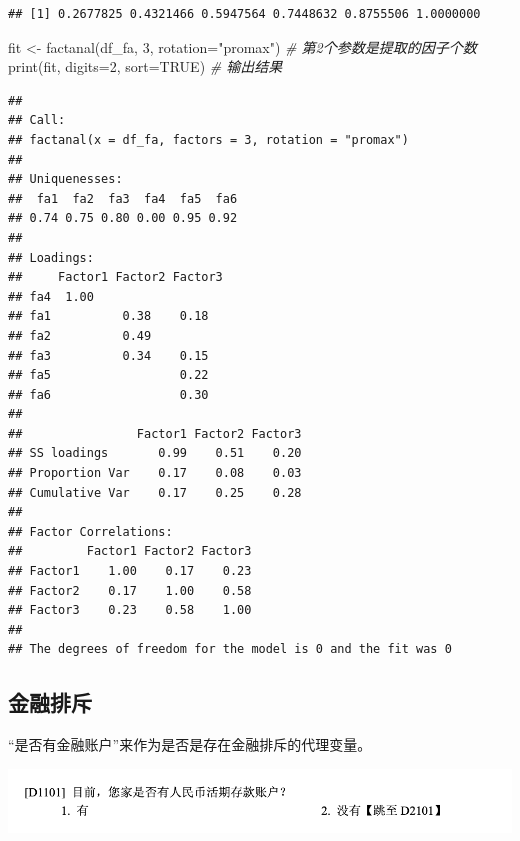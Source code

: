 \documentclass[
  oneside]{book}
\newenvironment{Shaded}{\begin{snugshade}}{\end{snugshade}}
\newcommand{\AttributeTok}[1]{\textcolor[rgb]{0.77,0.63,0.00}{#1}}
\newcommand{\CommentTok}[1]{\textcolor[rgb]{0.56,0.35,0.01}{\textit{#1}}}
\newcommand{\ConstantTok}[1]{\textcolor[rgb]{0.00,0.00,0.00}{#1}}
\newcommand{\DecValTok}[1]{\textcolor[rgb]{0.00,0.00,0.81}{#1}}
\newcommand{\FunctionTok}[1]{\textcolor[rgb]{0.00,0.00,0.00}{#1}}
\newcommand{\NormalTok}[1]{#1}
\newcommand{\OtherTok}[1]{\textcolor[rgb]{0.56,0.35,0.01}{#1}}
\newcommand{\StringTok}[1]{\textcolor[rgb]{0.31,0.60,0.02}{#1}}
\begin{document}
\begin{verbatim}
## [1] 0.2677825 0.4321466 0.5947564 0.7448632 0.8755506 1.0000000
\end{verbatim}

\begin{Shaded}
\begin{Highlighting}[]
\NormalTok{fit }\OtherTok{\textless{}{-}} \FunctionTok{factanal}\NormalTok{(df\_fa, }\DecValTok{3}\NormalTok{, }\AttributeTok{rotation=}\StringTok{"promax"}\NormalTok{) }\CommentTok{\# 第2个参数是提取的因子个数}
\FunctionTok{print}\NormalTok{(fit, }\AttributeTok{digits=}\DecValTok{2}\NormalTok{, }\AttributeTok{sort=}\ConstantTok{TRUE}\NormalTok{) }\CommentTok{\# 输出结果}
\end{Highlighting}
\end{Shaded}

\begin{verbatim}
## 
## Call:
## factanal(x = df_fa, factors = 3, rotation = "promax")
## 
## Uniquenesses:
##  fa1  fa2  fa3  fa4  fa5  fa6 
## 0.74 0.75 0.80 0.00 0.95 0.92 
## 
## Loadings:
##     Factor1 Factor2 Factor3
## fa4  1.00                  
## fa1          0.38    0.18  
## fa2          0.49          
## fa3          0.34    0.15  
## fa5                  0.22  
## fa6                  0.30  
## 
##                Factor1 Factor2 Factor3
## SS loadings       0.99    0.51    0.20
## Proportion Var    0.17    0.08    0.03
## Cumulative Var    0.17    0.25    0.28
## 
## Factor Correlations:
##         Factor1 Factor2 Factor3
## Factor1    1.00    0.17    0.23
## Factor2    0.17    1.00    0.58
## Factor3    0.23    0.58    1.00
## 
## The degrees of freedom for the model is 0 and the fit was 0
\end{verbatim}

\hypertarget{ux91d1ux878dux6392ux65a5}{%
\subsection{金融排斥}\label{ux91d1ux878dux6392ux65a5}}

``是否有金融账户''来作为是否是存在金融排斥的代理变量。

\includegraphics{image/account.png}
\end{document}
